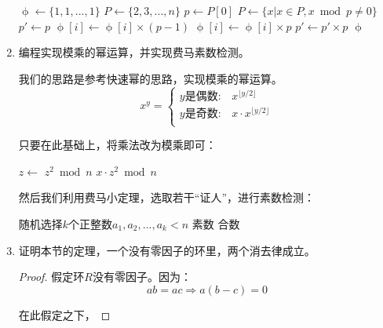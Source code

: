 \documentclass[UTF8]{article}
\begin{document}
\begin{enumerate}
\begin{algorithmic}
  \State $\upphi \gets \{1, 1, ..., 1\}$ 
  \State $P \gets \{2, 3, ..., n\}$ 
    \State $p \gets P[0]$
    \State $P \gets \{x | x \in P, x \bmod p \neq 0\}$
    \State $p' \gets p$
    \Repeat
          \State $\upphi[i] \gets \upphi[i] \times (p - 1)$
        \Else
          \State $\upphi[i] \gets \upphi[i] \times p$
        \EndIf
      \EndFor
      \State $p' \gets p' \times p$
  \EndWhile
  \State \Return $\upphi$
\EndFunction
\end{algorithmic}

\item 编程实现模乘的幂运算，并实现费马素数检测。

我们的思路是参考快速幂的思路，实现模乘的幂运算。
\[
x^y =
\begin{cases}
y \text{是偶数}: & x^{\lfloor y / 2 \rfloor} \\
y \text{是奇数}: & x \cdot x^{\lfloor y / 2 \rfloor} \\
\end{cases}
\]

只要在此基础上，将乘法改为模乘即可：

\begin{algorithmic}
    \State {}
  \EndIf
  \State $z \gets$ 
    \State \Return $z^2 \bmod n$
  \Else
    \State \Return $x \cdot z^2 \bmod n$
  \EndIf
\EndFunction
\end{algorithmic}

然后我们利用费马小定理，选取若干“证人”，进行素数检测：

\begin{algorithmic}
  \State 随机选择$k$个正整数$a_1, a_2, ..., a_k < n$
    \State \Return 素数
  \Else
    \State \Return 合数
  \EndIf
\EndFunction
\end{algorithmic}

\item {证明本节的定理，一个没有零因子的环里，两个消去律成立。}

\begin{proof}
假定环$R$没有零因子。因为：
\[
  ab = ac \Rightarrow a(b - c) = 0
\]

在此假定之下，


\end{proof}
\end{enumerate}
\end{document}
